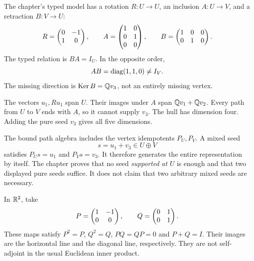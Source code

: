 
The chapter's typed model has a rotation $R:U\to U$, an inclusion $A:U\to V$, and a retraction $B:V\to U$:
\[
R=\begin{pmatrix}0&-1\\1&0\end{pmatrix},\qquad
A=\begin{pmatrix}1&0\\0&1\\0&0\end{pmatrix},\qquad
B=\begin{pmatrix}1&0&0\\0&1&0\end{pmatrix}.
\]
The typed relation is $BA=I_U$. In the opposite order,
\[
AB=\operatorname{diag}(1,1,0)\ne I_V.
\]
The missing direction is $\operatorname{Ker} B=\mathbb Q v_3$, not an entirely missing vertex.


The vectors $u_1,Ru_1$ span $U$. Their images under $A$ span $\mathbb Q v_1+\mathbb Q v_2$. Every path from $U$ to $V$ ends with $A$, so it cannot supply $v_3$. The hull has dimension four. Adding the pure seed $v_3$ gives all five dimensions.

The bound path algebra includes the vertex idempotents $P_U,P_V$. A mixed seed
\[
s=u_1+v_3\in U\oplus V
\]
satisfies $P_Us=u_1$ and $P_Vs=v_3$. It therefore generates the entire representation by itself. The chapter proves that no seed \emph{supported at $U$} is enough and that two displayed pure seeds suffice. It does not claim that two arbitrary mixed seeds are necessary.


In $\mathbb R^2$, take
\[
P=\begin{pmatrix}1&-1\\0&0\end{pmatrix},\qquad Q=\begin{pmatrix}0&1\\0&1\end{pmatrix}.
\]
These maps satisfy $P^2=P$, $Q^2=Q$, $PQ=QP=0$ and $P+Q=I$. Their images are the horizontal line and the diagonal line, respectively. They are not self-adjoint in the usual Euclidean inner product.

